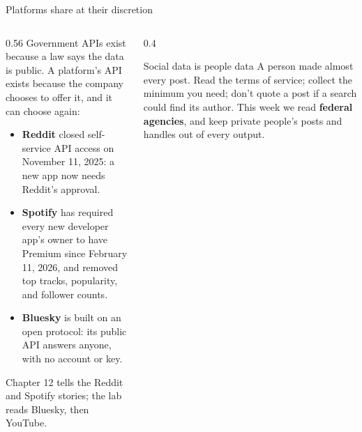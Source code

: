 \documentclass[9pt,aspectratio=169]{beamer}
\begin{document}
\begin{frame}{Platforms share at their discretion}
    \begin{columns}[T]
        \begin{column}{0.56\textwidth}
            Government APIs exist because a law says the data is public. A platform's API exists because the company chooses to offer it, and it can choose again:
            \begin{itemize}\small
                \item \textbf{Reddit} closed self-service API access on November 11, 2025: a new app now needs Reddit's approval.
                \item \textbf{Spotify} has required every new developer app's owner to have Premium since February 11, 2026, and removed top tracks, popularity, and follower counts.
                \item \textbf{Bluesky} is built on an open protocol: its public API answers anyone, with no account or key.
            \end{itemize}
            \small Chapter 12 tells the Reddit and Spotify stories; the lab reads Bluesky, then YouTube.
        \end{column}
        \begin{column}{0.4\textwidth}
            \begin{alertblock}{Social data is people data}
                \footnotesize A person made almost every post. Read the terms of service; collect the minimum you need; don't quote a post if a search could find its author. This week we read \textbf{federal agencies}, and keep private people's posts and handles out of every output.
            \end{alertblock}
        \end{column}
    \end{columns}
\end{frame}
\end{document}
